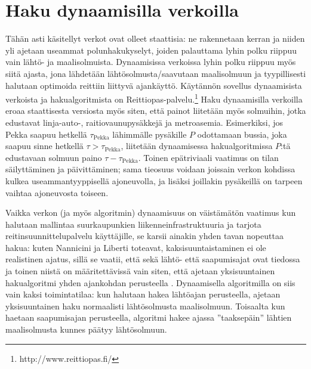 \documentclass[finnish]{tktltiki2}
\theoremstyle{definition}
\theoremstyle{remark}
\begin{document}
\section{Haku dynaamisilla verkoilla}
\label{sec:dynamic}
Tähän asti käsitellyt verkot ovat olleet staattisia: ne rakennetaan kerran ja niiden yli ajetaan useammat polunhakukyselyt, joiden palauttama lyhin polku riippuu vain lähtö- ja maalisolmuista. Dynaamisissa verkoissa lyhin polku riippuu myös siitä ajasta, jona lähdetään lähtösolmusta/saavutaan maalisolmuun ja tyypillisesti halutaan optimoida reittiin liittyvä ajankäyttö. Käytännön sovellus dynaamisista verkoista ja hakualgoritmista on Reittiopas-palvelu.\footnote{http://www.reittiopas.fi/} Haku dynaamisilla verkoilla eroaa staattisesta versiosta myös siten, että painot liitetään myös solmuihin, jotka edustavat linja-auto-, raitiovaunupysäkkejä ja metroasemia. Esimerkiksi, jos Pekka saapuu hetkellä $\tau_{\text{Pekka}}$ lähimmälle pysäkille $P$ odottamaan bussia, joka saapuu sinne hetkellä $\tau > \tau_{\text{Pekka}}$, liitetään dynaamisessa hakualgoritmissa $P$:tä edustavaan solmuun paino $\tau - \tau_{\text{Pekka}}$. Toinen epätriviaali vaatimus on tilan säilyttäminen ja päivittäminen; sama tieosuus voidaan joissain verkon kohdissa kulkea useammantyyppisellä ajoneuvolla, ja lisäksi joillakin pysäkeillä on tarpeen vaihtaa ajoneuvosta toiseen.

Vaikka verkon (ja myös algoritmin) dynaamisuus on väistämätön vaatimus kun halutaan mallintaa suurkaupunkien liikenneinfrastruktuuria ja tarjota reitinsuunnittelupalvelu käyttäjille, se karsii ainakin yhden tavan nopeuttaa hakua: kuten Nannicini ja Liberti toteavat, kaksisuuntaistaminen ei ole realistinen ajatus, sillä se vaatii, että sekä lähtö- että saapumisajat ovat tiedossa ja toinen niistä on määritettävissä vain siten, että ajetaan yksisuuntainen hakualgoritmi yhden ajankohdan perusteella \cite{Nannicini08}.
Dynaamisella algoritmilla on siis vain kaksi toimintatilaa: kun halutaan hakea lähtöajan perusteella, ajetaan yksisuuntainen haku normaalisti lähtösolmusta maalisolmuun. Toisaalta kun haetaan saapumisajan perusteella, algoritmi hakee ajassa ''taaksepäin'' lähtien maalisolmusta kunnes päätyy lähtösolmuun.
\end{document}
